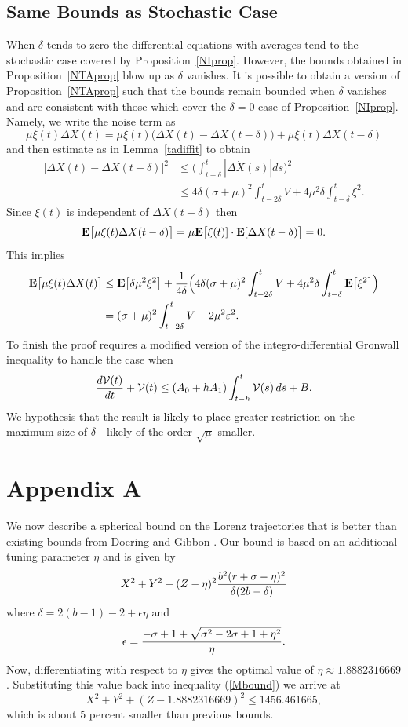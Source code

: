 \documentclass[master,tocprelim,12pt]{unrthesis}
\theoremstyle{definition}
\numberwithin{equation}{chapter}
\begin{document}
\begin{manuscript}
\section{Same Bounds as Stochastic Case} 
When $\delta$ tends to zero the differential equations with averages
tend to the stochastic case covered by Proposition~\ref{NIprop}.
However, the bounds obtained in Proposition~\ref{NTAprop} blow up
as $\delta$ vanishes.  It is possible to obtain a version of 
Proposition~\ref{NTAprop} such that the bounds remain bounded
when $\delta$ vanishes and are consistent with those which
cover the $\delta=0$ case of Proposition~\ref{NIprop}.  Namely,
we write the noise term as
$$
	\mu\xi(t)\Delta X(t) =
	\mu\xi(t)\big(\Delta X(t)-\Delta X(t-\delta)\big) +
	\mu\xi(t)\Delta X(t-\delta)
$$
and then estimate as in Lemma~\ref{tadiffit} to obtain
\begin{align*}
	|\Delta X(t)-\Delta X(t-\delta)|^2
		&\le \Big(\int_{t-\delta}^t |\Delta \dot X(s)|ds\Big)^2\\
		&\le 4\delta(\sigma +\mu)^2\int_{t-2\delta}^t V
			+ 4\mu^2\delta\int_{t-\delta}^t \xi^2.
\end{align*}
Since $\xi(t)$ is independent of $\Delta X(t-\delta)$ then
$$
	{\bf E}\big[\mu\xi(t)\Delta X(t-\delta)\big]
	=\mu {\bf E}\big[\xi(t)]\cdot {\bf E}[\Delta X(t-\delta)\big]=0.
$$
This implies
\begin{align*}
	{\bf E}\big[\mu\xi(t)\Delta X(t)\big] 
		&\le
	{\bf E}\big[\delta\mu^2\xi^2\big]
		+{1\over 4\delta}
		\Big(
4\delta(\sigma +\mu)^2\int_{t-2\delta}^t V
            + 4\mu^2\delta\int_{t-\delta}^t 
				{\bf E}\big[\xi^2 \big] \Big) \\
		&= 
(\sigma +\mu)^2\int_{t-2\delta}^t V
+2\mu^2\varepsilon^2.
\end{align*}
To finish the proof requires a modified version of the
integro-differential Gronwall inequality to handle the case
when
$$
	{d{\cal V}(t)\over dt}
		+{\cal V}(t)
	\le (A_0+hA_1)\int_{t-h}^t {\cal V}(s)\,ds + B.
$$
We hypothesis that the result is likely to place greater restriction
on the maximum size of $\delta$---likely of the order $\sqrt \mu$
smaller.

\chapter*{Appendix A}

We now describe a spherical bound on the Lorenz trajectories that is
better than existing bounds from Doering and Gibbon \cite{Doering95a}.
Our bound is based on an additional tuning parameter $\eta$ 
and is given by
\begin{equation}\label{Mbound}
    X^2 + Y^2 + (Z-\eta)^2 
    {b^2(r + \sigma - \eta)^2 \over \delta(2b - \delta)}
\end{equation}
where
$\delta = 2(b-1)-2 + \epsilon \eta$ and
$$
    \epsilon = {-\sigma + 1 + \sqrt{\sigma^2 - 2\sigma + 1 + \eta^2} \over
    \eta}. 
$$
Now, differentiating with respect to $\eta$ gives 
the optimal value of $\eta \approx 1.8882316669$.
Substituting this value back into inequality (\ref{Mbound})
we arrive at
$$
    X^2 + Y^2 + (Z-1.8882316669)^2 \le 1456.461665,
$$
which is about $5$ percent smaller than previous bounds.


\end{manuscript}
\end{document}
